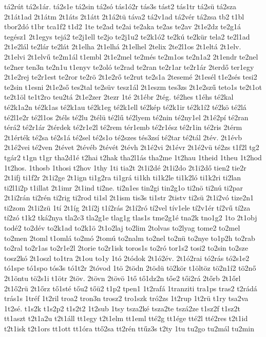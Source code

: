 {tá2rút
tá2s1ár.
tá2s1e
tá2sin
tá2só
tás1ó2r
tás3s
tást2
tás1tr
tá2sü
tá2sza
2t1át1ad
2t1átm
2t1áts
2t1átt
2t1á2tü
táva2
tá2v1ad
tá2vér
tá2zsa
tb2
t1bl
tbor2dó
t1br
tca1f2
t1d2
1te
te2ad
te2ai
te2aka
te2as
te2av
2t1e2dz
te2g1á
tegész1
2t1egys
tejá2
te2j1ell
te2jo
te2j1u2
te2k1ó2
te2kú
te2kür
tela2
te2l1ad
2t1e2lál
te2lár
te2lát
2t1elha
2t1elhá
2t1elhel
2telix
2te2l1os
2t1eltá
2t1elv.
2t1elvi
2t1elvű
te2m1ál
t1embl
2t1e2mel
te2més
te2m1os
te2n1a2
2t1endr
te2nel
te2ner
ten3n
te2n1u
t1enyv
te2oló
te2rad
te2ran
te2r1ar
te2r1ár
2terdő
ter1egy
2t1e2rej
te2r1est
te2ror
te2rö
2t1e2rő
te2rut
te2s1a
2tesemé
2t1esél
t1e2sés
tesi2
te2sin
t1esni
2t1e2ső
tes2tal
te2süv
tesz1ál
2t1eszm
tes3zs
2t1e2szű
teto1s
te2t1ot
te2t1öl
te1t2ro
teu2tá
2t1e2zer
2tezr
1té
2t1ébr
2tég.
té2hes
t1éhs
té2kal
té2k1a2n
té2k1as
té2k1au
té2k1eg
té2k1ell
té2kép
té2k1ir
té2k1í2
té2kö
té2lá
té2l1e2r
té2l1os
2téls
té2lu
2télü
té2lű
té2lyem
té2nin
té2ny1el
2t1é2pí
té2ran
térá2
té2r1ár
2térdek
té2r1e2l
té2rem
tér1emb
té2r1ész
té2r1in
té2ris
2térm
2t1érték
té2sa
té2s1á
té2sel
té2s1o
té2szes
tés3zsí
té2tar
té2tál
2tév.
2t1évb
2t1é2vei
té2ven
2tévet
2tévéb
2tévét
2tévh
2t1é2vi
2t1évr
2t1é2vü
té2zs
t1f2l
tg2
tgár2
t1gn
t1gr
tha2d1é
t2hai
t2hak
tha2l1ás
tha2me
1t2hau
1theid
1theu
1t2hod
1t2hos.
1thosb
1thosi
t2hov
1thy
1ti
tia2t
2t1i2dé
2t1i2do
2t1i2dő
tien2
tie2r
2t1ifj
ti1f2r
2t1i2ge
2t1ign
ti1g2ra
ti1grá
ti1kh
ti1k2le
ti1k2ló
ti1k2ri
ti2lan
ti2l1i2p
t1illat
2t1imr
2t1ind
ti2ne.
ti2n1es
tin2gi
tin2g1o
ti2nö
ti2nú
ti2par
2t1i2rán
ti2rén
ti2rig
ti2rod
ti1sl
2t1ism
tis3s
ti1str
2tistv
ti2sü
2t1i2vó
tize2n1
ti2zom
2t1i2zü
1tí
2t1íg
2t1í2j
t1í2rás
2t1í2ró
tí2vel
tív1ele
tí2v1ér
tí2vű
tí2za
tí2zó
t1k2
tká2nya
tla2c3
tla2g1e
tlag1g
tlas1s
tme2g1é
tna2k
tno1g2
1to
2t1obj
todé2
to2dév
to2k1ad
to2k1ö
2t1o2laj
to2lim
2tolvas
to2lyag
tome2
to2mel
to2men
2toml
t1omlá
to2mó
2tomú
to2nalm
to2nel
to2nü
to2nye
to1p2h
to2rab
to2ral
to2r1as
to2r1e2l
2torie
to2r1isk
toros1s
to2ró
tor1s2
tosi2
to2sin
to2sze
tosz2kó
2t1oszl
to1tra
2t1ou
to1y
1tó
2tódok
2t1ó2év.
2t1ó2rai
tó2rás
tó2s1e2
tó1spe
tó1spo
tós3s
tó1t2r
2tóvod
1tö
2tödn
2tödü
tö2kör
t1öltöz
tö2n1í2
tö2nő
2t1öntu
tö2s1i
t1ötr
2töv.
2tövn
2tövö
1tő
tő1dz2n
tőe2
tői2rá
2tőrb
2t1őrl
2t1ő2rü
2t1őrz
tő1sté
tőu2
tőü2
t1p2
tpen1
1t2rafá
1tranziti
tra1ps
tras2
t2rádá
trás1s
1tréf
1t2ril
troa2
tron3n
trosz2
tro1szk
tró2zs
1t2rup
1t2rü
t1ry
tsa2va
1t2sé.
t1s2k
t1s2p2
t1s2t2
1t2sub
1tsy
tsza2ké
tsza2te
tszá2ze
t1sz2f
t1sz2t
tt1aszt
t2t1a2u
t2t1áll
tt1egy
t2t1elm
tt1eml
tté2g
tt1ége
tté2l
tté2res
t2t1id
t2t1isk
t2t1ors
tt1ott
tt1óra
ttő2sa
tt2rén
ttűz3s
t2ty
1tu
tu2go
tu2mál
tu2min
}
